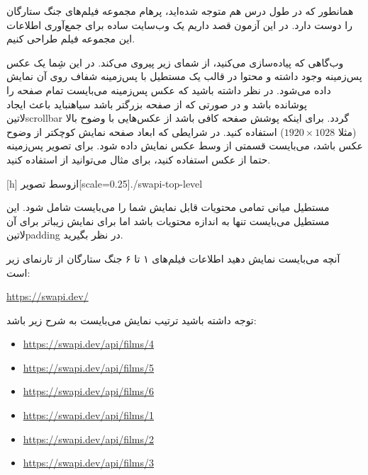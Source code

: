 \documentclass[../main.tex]{subfiles}
\begin{document}

همانطور که در طول درس هم متوجه شده‌اید، پرهام مجموعه فیلم‌های جنگ ستارگان را دوست دارد.
در این آزمون قصد داریم یک وب‌سایت ساده برای جمع‌آوری اطلاعات این مجموعه فیلم طراحی کنیم.

وب‌گاهی که پیاده‌سازی می‌کنید، از شمای زیر پیروی می‌کند. در این شِما یک عکس پس‌زمینه وجود داشته و محتوا در قالب یک مستطیل با پس‌زمینه شفاف روی آن نمایش داده می‌شود.
در نظر داشته باشید که عکس پس‌زمینه می‌بایست تمام صفحه را پوشانده باشد و در صورتی که از صفحه بزرگتر باشد ‌سیاه{نباید} باعث ایجاد ‌لاتین{scrollbar} گردد.
برای اینکه پوشش صفحه کافی باشد از عکس‌هایی با وضوح بالا (مثلا $1920 \times 1028$) استفاده کنید.
در شرایطی که ابعاد صفحه نمایش کوچکتر از وضوح عکس باشد، می‌بایست قسمتی از وسط عکس نمایش داده شود.
برای تصویر پس‌زمینه حتما از عکس استفاده کنید، برای مثال می‌توانید از  استفاده کنید.

[h]
  ‌ازوسط
  ‌تصویر[scale=0.25]{./swapi-top-level}

مستطیل میانی تمامی محتویات قابل نمایش شما را می‌بایست شامل شود. این مستطیل می‌بایست تنها به اندازه محتویات باشد اما
برای نمایش زیباتر برای آن ‌لاتین{padding} در نظر بگیرید.


آنچه می‌بایست نمایش دهید اطلاعات فیلم‌های ۱ تا ۶ جنگ ستارگان از تارنمای زیر است:

\begin{latin}
  \url{https://swapi.dev/}
\end{latin}

توجه داشته باشید ترتیب نمایش می‌بایست به شرح زیر باشد:

\begin{latin}\begin{itemize}
  \item \url{https://swapi.dev/api/films/4}
  \item \url{https://swapi.dev/api/films/5}
  \item \url{https://swapi.dev/api/films/6}
  \item \url{https://swapi.dev/api/films/1}
  \item \url{https://swapi.dev/api/films/2}
  \item \url{https://swapi.dev/api/films/3}
\end{itemize}\end{latin}
\end{document}
